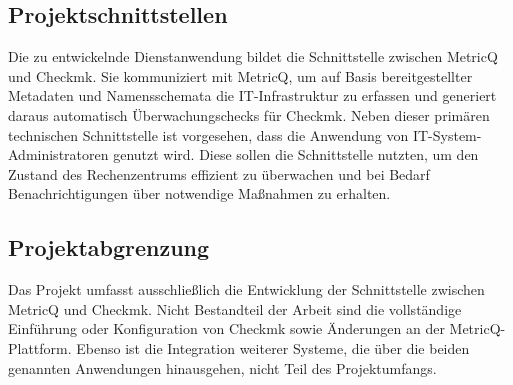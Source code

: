\subsection{Projektschnittstellen}
Die zu entwickelnde Dienstanwendung bildet die Schnittstelle zwischen \gls{MetricQ} und \gls{Checkmk}.
Sie kommuniziert mit \gls{MetricQ}, um auf Basis bereitgestellter Metadaten und Namensschemata die IT-Infrastruktur zu erfassen und generiert daraus automatisch Überwachungschecks für \gls{Checkmk}.
Neben dieser primären technischen Schnittstelle ist vorgesehen, dass die Anwendung von IT-System-Administratoren genutzt wird.
Diese sollen die Schnittstelle nutzten, um den Zustand des Rechenzentrums effizient zu überwachen und bei Bedarf Benachrichtigungen über notwendige Maßnahmen zu erhalten.

\subsection{Projektabgrenzung}
Das Projekt umfasst ausschließlich die Entwicklung der Schnittstelle zwischen \gls{MetricQ} und \gls{Checkmk}.
Nicht Bestandteil der Arbeit sind die vollständige Einführung oder Konfiguration von \gls{Checkmk} sowie Änderungen an der \gls{MetricQ}-Plattform.
Ebenso ist die Integration weiterer Systeme, die über die beiden genannten Anwendungen hinausgehen, nicht Teil des Projektumfangs.
